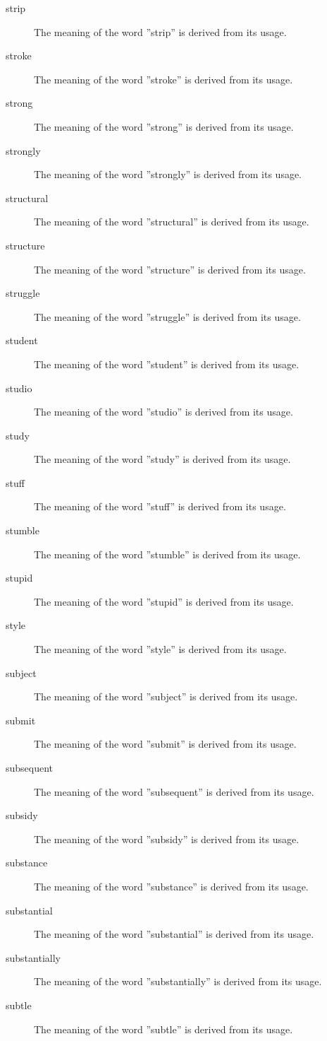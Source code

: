 \documentclass[12pt, letterpaper]{memoir}
\begin{document}
\begin{description}
\item[strip] The meaning of the word ''strip'' is derived from its usage.
\item[stroke] The meaning of the word ''stroke'' is derived from its usage.
\item[strong] The meaning of the word ''strong'' is derived from its usage.
\item[strongly] The meaning of the word ''strongly'' is derived from its usage.
\item[structural] The meaning of the word ''structural'' is derived from its usage.
\item[structure] The meaning of the word ''structure'' is derived from its usage.
\item[struggle] The meaning of the word ''struggle'' is derived from its usage.
\item[student] The meaning of the word ''student'' is derived from its usage.
\item[studio] The meaning of the word ''studio'' is derived from its usage.
\item[study] The meaning of the word ''study'' is derived from its usage.
\item[stuff] The meaning of the word ''stuff'' is derived from its usage.
\item[stumble] The meaning of the word ''stumble'' is derived from its usage.
\item[stupid] The meaning of the word ''stupid'' is derived from its usage.
\item[style] The meaning of the word ''style'' is derived from its usage.
\item[subject] The meaning of the word ''subject'' is derived from its usage.
\item[submit] The meaning of the word ''submit'' is derived from its usage.
\item[subsequent] The meaning of the word ''subsequent'' is derived from its usage.
\item[subsidy] The meaning of the word ''subsidy'' is derived from its usage.
\item[substance] The meaning of the word ''substance'' is derived from its usage.
\item[substantial] The meaning of the word ''substantial'' is derived from its usage.
\item[substantially] The meaning of the word ''substantially'' is derived from its usage.
\item[subtle] The meaning of the word ''subtle'' is derived from its usage.

\end{description}
\end{document}
